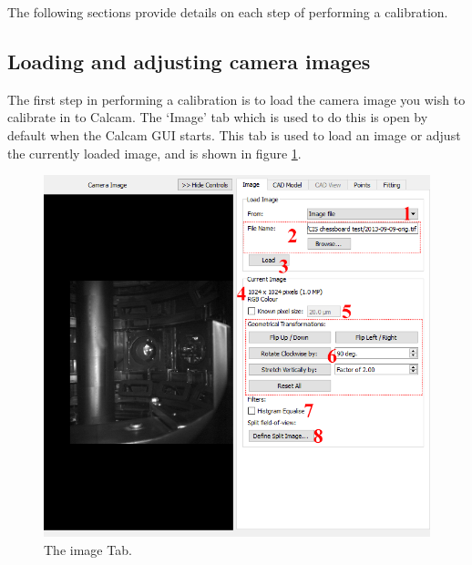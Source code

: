 \documentclass[12pt]{article}
\begin{document}
The following sections provide details on each step of performing a calibration.

\subsection{Loading and adjusting camera images}

The first step in performing a calibration is to load the camera image you wish to calibrate in to Calcam. The `Image' tab which is used to do this is open by default when the Calcam GUI starts. This tab is used to load an image or adjust the currently loaded image, and is shown in figure \ref{fig:im_tab}.

\begin{figure}[ht]
\includegraphics[width=\textwidth]{load_image.PNG}
\caption{\label{fig:im_tab} The image Tab.}
\end{figure}
\end{document}
